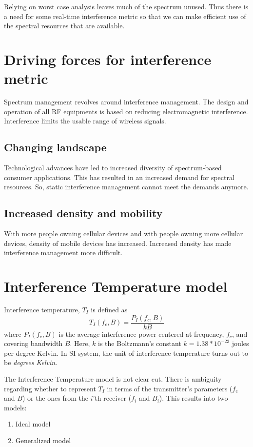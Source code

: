 \documentclass[12pt]{article}
\begin{document}
Relying on worst case analysis leaves much of the spectrum unused. Thus there is a need for some real-time interference metric so that we can make efficient use of the spectral resources that are available.

\section{Driving forces for interference metric}

Spectrum management revolves around interference management\cite{kolodzy2006}. The design and operation of all RF equipments is based on reducing electromagnetic interference. Interference limits the usable range of wireless signals.

\subsection*{Changing landscape}

Technological advances have led to increased diversity of spectrum-based consumer applications. This has resulted in an increased demand for spectral resources. So, static interference management cannot meet the demands anymore.

\subsection*{Increased density and mobility}

With more people owning cellular devices and with people owning more cellular devices, density of mobile devices has increased. Increased density has made interference management more difficult.

\section{Interference Temperature model}
Interference temperature, $T_I$ is defined\cite{clancy2006, kolodzy2006} as
\begin{equation*} 
    T_I(f_c , B) = \frac{P_I(f_c , B)}{kB}
\end{equation*}
where $P_I(f_c,B)$ is the average interference power centered at frequency, $f_c$, and covering bandwidth
$B$. Here, $k$ is the Boltzmann's constant $k = 1.38 * 10^{-23} $ joules per degree Kelvin. In SI system, the unit of interference temperature turns out to be \emph{degrees Kelvin}.

The Interference Temperature model\cite{clancy2006} is not clear cut. There is ambiguity regarding whether to represent $T_I$ in terms of the transmitter's parameters ($f_c$ and $B$) or the ones from the $i$'th receiver ($f_i$ and $B_i$).
This results into two models\cite{clancy2006}:
\begin{enumerate}
    \item Ideal model
    \item Generalized model
\end{enumerate}
\end{document}

